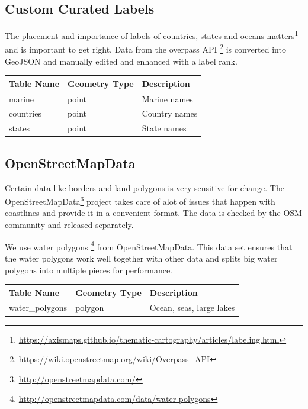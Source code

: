 \subsection{Custom Curated Labels}

The placement and importance of labels of countries, states and oceans matters\footnote{\url{https://axismaps.github.io/thematic-cartography/articles/labeling.html}} and is important to get right. Data from the overpass API \footnote{\url{https://wiki.openstreetmap.org/wiki/Overpass_API}} is converted into GeoJSON and
manually edited and enhanced with a label rank.

\begin{flushleft}
    \begin{tabular}{lll}
    \hline
    Table Name   & Geometry Type & Description \\
    \hline                                          
    marine       & point    & Marine names \\
    countries    & point    & Country names \\
    states       & point    & State names \\
    \end{tabular}
\end{flushleft}

\subsection{OpenStreetMapData}

Certain \osm{} data like borders and land polygons is very sensitive for change.
The OpenStreetMapData\footnote{\url{http://openstreetmapdata.com/}}
project takes care of alot of issues that happen with coastlines
and provide it in a convenient format. The data is checked by the OSM community
and released separately.

We use water polygons \footnote{\url{http://openstreetmapdata.com/data/water-polygons}} from OpenStreetMapData. This data set ensures that the water polygons
work well together with other \osm{} data and splits big water polygons into multiple 
pieces for performance.

\begin{flushleft}
    \begin{tabular}{lll}
    \hline
    Table Name            & Geometry Type & Description \\
    \hline
    water\_polygons        & polygon       & Ocean, seas, large lakes           \\
    \end{tabular}
\end{flushleft}

